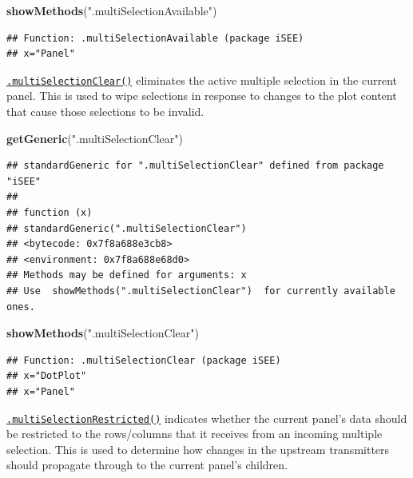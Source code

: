 \documentclass[
]{book}
\newenvironment{Shaded}{\begin{snugshade}}{\end{snugshade}}
\newcommand{\KeywordTok}[1]{\textcolor[rgb]{0.13,0.29,0.53}{\textbf{#1}}}
\newcommand{\NormalTok}[1]{#1}
\newcommand{\StringTok}[1]{\textcolor[rgb]{0.31,0.60,0.02}{#1}}
\begin{document}
\begin{Shaded}
\begin{Highlighting}[]
\KeywordTok{showMethods}\NormalTok{(}\StringTok{".multiSelectionAvailable"}\NormalTok{)}
\end{Highlighting}
\end{Shaded}

\begin{verbatim}
## Function: .multiSelectionAvailable (package iSEE)
## x="Panel"
\end{verbatim}

\href{https://isee.github.io/iSEE/reference/multi-select-generics.html}{\texttt{.multiSelectionClear()}} eliminates the active multiple selection in the current panel.
This is used to wipe selections in response to changes to the plot content that cause those selections to be invalid.

\begin{Shaded}
\begin{Highlighting}[]
\KeywordTok{getGeneric}\NormalTok{(}\StringTok{".multiSelectionClear"}\NormalTok{)}
\end{Highlighting}
\end{Shaded}

\begin{verbatim}
## standardGeneric for ".multiSelectionClear" defined from package "iSEE"
## 
## function (x) 
## standardGeneric(".multiSelectionClear")
## <bytecode: 0x7f8a688e3cb8>
## <environment: 0x7f8a688e68d0>
## Methods may be defined for arguments: x
## Use  showMethods(".multiSelectionClear")  for currently available ones.
\end{verbatim}

\begin{Shaded}
\begin{Highlighting}[]
\KeywordTok{showMethods}\NormalTok{(}\StringTok{".multiSelectionClear"}\NormalTok{)}
\end{Highlighting}
\end{Shaded}

\begin{verbatim}
## Function: .multiSelectionClear (package iSEE)
## x="DotPlot"
## x="Panel"
\end{verbatim}

\href{https://isee.github.io/iSEE/reference/multi-select-generics.html}{\texttt{.multiSelectionRestricted()}} indicates whether the current panel's data should be restricted to the rows/columns that it receives from an incoming multiple selection.
This is used to determine how changes in the upstream transmitters should propagate through to the current panel's children.
\end{document}
